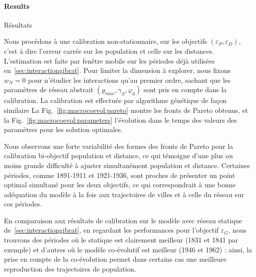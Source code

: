 



\paragraph{Results}{Résultats}


Nous procédons à une calibration non-stationnaire, sur les objectifs $(\varepsilon_P,\varepsilon_D)$, c'est à dire l'erreur carrée sur les population et celle sur les distances. L'estimation est faite par fenêtre mobile sur les périodes déjà utilisées en~\ref{sec:interactiongibrat}. Pour limiter la dimension à explorer, nous fixons $w_N = 0$ pour n'étudier les interactions qu'au premier ordre, sachant que les paramètres de réseau abstrait $(g_{max},\gamma_S,\varphi_0)$ sont pris en compte dans la calibration. La calibration est effectuée par algorithme génétique de façon similaire La Fig.~\ref{fig:macrocoevol:pareto} montre les fronts de Pareto obtenus, et la Fig.~\ref{fig:macrocoevol:parameters} l'évolution dans le temps des valeurs des paramètres pour les solution optimales.


Nous observons une forte variabilité des formes des fronts de Pareto pour la calibration bi-objectif population et distance, ce qui témoigne d'une plus ou moins grande difficulté à ajuster simultanément population et distance. Certaines périodes, comme 1891-1911 et 1921-1936, sont proches de présenter un point optimal simultané pour les deux objectifs, ce qui correspondrait à une bonne adéquation du modèle à la fois aux trajectoires de villes et à celle du réseau sur ces périodes.

En comparaison aux résultats de calibration sur le modèle avec réseau statique de~\ref{sec:interactiongibrat}, en regardant les performances pour l'objectif $\varepsilon_G$, nous trouvons des périodes où le statique est clairement meilleur (1831 et 1841 par exemple) et d'autres où le modèle co-évolutif est meilleur (1946 et 1962) : ainsi, la prise en compte de la co-évolution permet dans certains cas une meilleure reproduction des trajectoires de population.


